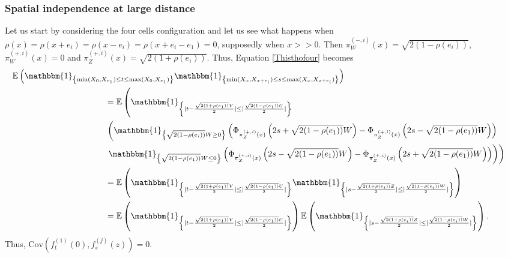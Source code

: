 \documentclass[12pt]{article}
\theoremstyle{Theorem}
\theoremstyle{definition}
\begin{document}
\subsubsection{Spatial independence at large distance} 
Let us start by considering the four cells configuration and let us see what happens when ${\rho(x) = \rho(x+e_i) = \rho(x-e_i) = \rho(x + e_i - e_1) = 0}$, supposedly when $x > > 0$. Then
$\pi^{\scriptscriptstyle(-, i)}_{W}(x) = \sqrt{2(1-\rho(e_i))}$, $\pi^{\scriptscriptstyle(+, i)}_{W}(x) = 0$ and $\pi^{\scriptscriptstyle(+, i)}_{Z}(x) = \sqrt{2(1+\rho(e_i))}.$ Thus, Equation \eqref{Thisthofour} becomes 
{\small
\begin{align*}
\mathbb{E}\left(\mathbbm{1}_{\left\{\min(X_{\scriptscriptstyle 0}, X_{e_1}) \leq t \leq \max(X_{\scriptscriptstyle 0}, X_{e_1})\right\}}\mathbbm{1}_{\left\{\min(X_{\scriptscriptstyle x}, X_{x+e_i}) \leq s \leq \max(X_{\scriptscriptstyle x}, X_{x+e_i}) \right\}}\right) \nonumber \\
& \hspace{-10cm} = \mathbb{E}\left(\mathbbm{1}_{\left\{ |t - \frac{\sqrt{2(1+\rho(e_1))}V}{2}| \leq |\frac{\sqrt{2(1-\rho(e_1))}U}{2}|\right\}} \right.  \\
& \left. \hspace{-10cm} \left(\mathbbm{1}_{\left\{\sqrt{2(1-\rho(e_i))}W \geq 0\right\}} \left(\Phi_{\pi^{\scriptscriptstyle(+, i)}_{Z}(x)}\left( 2s + \sqrt{2(1-\rho(e_1))} W\right) - \Phi_{\pi^{\scriptscriptstyle(+, i)}_{Z}(x)}\left(2s - \sqrt{2(1-\rho(e_1))} W\right)\right) \right. \right. \\
&  \hspace{-10cm} \left. \left. \mathbbm{1}_{\left\{\sqrt{2(1-\rho(e_1))} W  \leq 0\right\}} \left(\Phi_{\pi^{\scriptscriptstyle(+, i)}_{Z}(x)}\left( 2s - \sqrt{2(1-\rho(e_1))}W \right) - \Phi_{\pi^{\scriptscriptstyle(+, i)}_{Z}(x)}\left(2s + \sqrt{2(1-\rho(e_1))} W\right)\right)\right)\right)\\ 
& \hspace{-10cm} = \mathbb{E}\left(\mathbbm{1}_{\left\{ |t - \frac{\sqrt{2(1+\rho(e_1))}V}{2}| \leq |\frac{\sqrt{2(1-\rho(e_1))}U}{2}|\right\}}\mathbbm{1}_{\left\{ |s - \frac{\sqrt{2(1+\rho(e_i))}Z}{2}| \leq |\frac{\sqrt{2(1-\rho(e_i))}W}{2}|\right\}}\right) \\
& \hspace{-10cm} = \mathbb{E}\left(\mathbbm{1}_{\left\{ |t - \frac{\sqrt{2(1+\rho(e_1))}V}{2}| \leq |\frac{\sqrt{2(1-\rho(e_1))}U}{2}|\right\}}\right)\mathbb{E}\left(\mathbbm{1}_{\left\{ |s - \frac{\sqrt{2(1+\rho(e_i))}Z}{2}| \leq |\frac{\sqrt{2(1-\rho(e_i))}W}{2}|\right\}}\right).
\end{align*}
}Thus, $\text{Cov}\left(f_{t}^{\scriptscriptstyle (1)}(0), f_{s}^{ \scriptscriptstyle (j)}(z)\right) = 0.$
\end{document}
